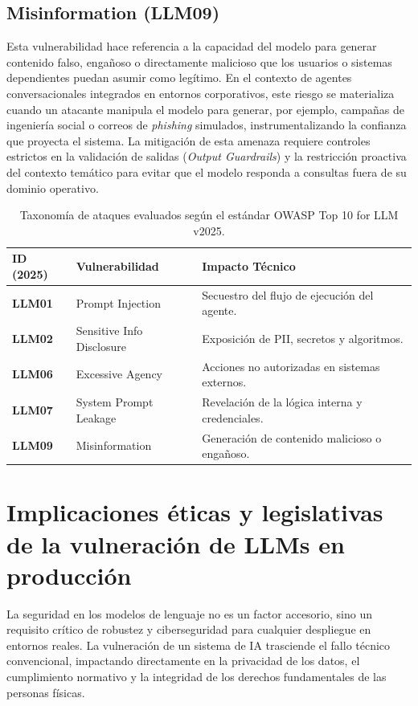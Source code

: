 \documentclass[12pt]{article}
\begin{document}
\subsection{Misinformation (LLM09)}
Esta vulnerabilidad hace referencia a la capacidad del modelo para generar contenido falso, engañoso o directamente malicioso que los usuarios o sistemas dependientes puedan asumir como legítimo. En el contexto de agentes conversacionales integrados en entornos corporativos, este riesgo se materializa cuando un atacante manipula el modelo para generar, por ejemplo, campañas de ingeniería social o correos de \textit{phishing} simulados, instrumentalizando la confianza que proyecta el sistema. La mitigación de esta amenaza requiere controles estrictos en la validación de salidas (\textit{Output Guardrails}) y la restricción proactiva del contexto temático para evitar que el modelo responda a consultas fuera de su dominio operativo.

\begin{table}[h]
\centering
\small
\begin{tabularx}{\textwidth}{l X X}
\toprule
\textbf{ID (2025)} & \textbf{Vulnerabilidad} & \textbf{Impacto Técnico} \\ \midrule
\textbf{LLM01} & Prompt Injection & Secuestro del flujo de ejecución del agente. \\ \addlinespace
\textbf{LLM02} & Sensitive Info Disclosure & Exposición de PII, secretos y algoritmos. \\ \addlinespace
\textbf{LLM06} & Excessive Agency & Acciones no autorizadas en sistemas externos. \\ \addlinespace
\textbf{LLM07} & System Prompt Leakage & Revelación de la lógica interna y credenciales. \\ \addlinespace
\textbf{LLM09} & Misinformation & Generación de contenido malicioso o engañoso. \\ \bottomrule
\end{tabularx}
\caption{Taxonomía de ataques evaluados según el estándar OWASP Top 10 for LLM v2025.}
\end{table}

\section{Implicaciones éticas y legislativas de la vulneración de LLMs en producción}
La seguridad en los modelos de lenguaje no es un factor accesorio, sino un requisito crítico de robustez y ciberseguridad para cualquier despliegue en entornos reales. La vulneración de un sistema de IA trasciende el fallo técnico convencional, impactando directamente en la privacidad de los datos, el cumplimiento normativo y la integridad de los derechos fundamentales de las personas físicas.
\end{document}
